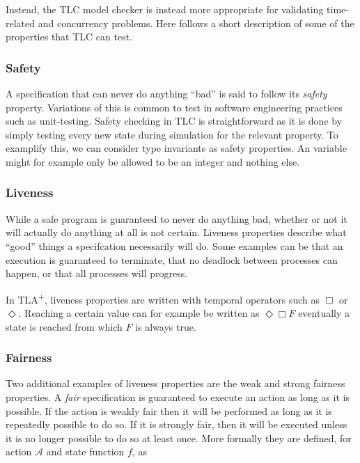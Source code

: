 \documentclass[english, biblatex, digitaloutput]{kththesis}
\begin{document}
Instead, the TLC model checker is instead more appropriate for validating time-related and concurrency problems. Here follows a short description of some of the properties that TLC can test.

\subsubsection{Safety}

A specification that can never do anything ``bad'' is said to follow its \textit{safety} property. Variations of this is common to test in software engineering practices such as unit-testing. Safety checking in TLC is straightforward as it is done by simply testing every new state during simulation for the relevant property. To examplify this, we can consider type invariants as safety properties. An variable might for example only be allowed to be an integer and nothing else.

\subsubsection{Liveness}

While a safe program is guaranteed to never do anything bad, whether or not it will actually do anything at all is not certain. Liveness properties describe what ``good'' things a specifcation necessarily will do. Some examples can be that an execution is guaranteed to terminate, that no deadlock between processes can happen, or that all processes will progress.

In TLA\textsuperscript+, liveness properties are written with temporal operators such as $\Box$ or $\Diamond$. Reaching a certain value can for example be written as $\Diamond \Box F$ \ie eventually a state is reached from which $F$ is always true.

\subsubsection{Fairness}

Two additional examples of liveness properties are the weak and strong fairness properties. A \textit{fair} specification is guaranteed to execute an action as long as it is possible. If the action is weakly fair then it will be performed as long as it is repeatedly possible to do so. If it is strongly fair, then it will be executed unless it is no longer possible to do so at least once. More formally they are defined, for action $\mathcal{A}$ and state function $f$, as
\end{document}
